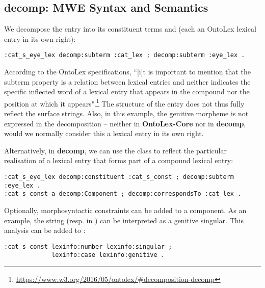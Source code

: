 \documentclass[output=paper,colorlinks,citecolor=brown]{langscibook}
\begin{document}
\subsection{decomp: MWE Syntax and Semantics}
\label{sec:decomp_mwe}


We decompose the entry into its constituent terms  and  (each an OntoLex lexical entry in its own right):

{\listingsize
\begin{verbatim}
:cat_s_eye_lex decomp:subterm :cat_lex ; decomp:subterm :eye_lex .
\end{verbatim}
}

\noindent According to the OntoLex specifications, ``[i]t is important to mention that the subterm property is a relation between lexical entries and neither indicates the specific inflected word of a lexical entry that appears in the compound nor the position at which it appears".\footnote{\url{https://www.w3.org/2016/05/ontolex/\#decomposition-decomp}}
The structure of the entry does not thus fully reflect the surface strings. Also, in this example, the genitive morpheme  is not expressed in the decomposition -- neither in \textbf{OntoLex-Core} nor in \textbf{decomp}, would we normally consider this a lexical entry in its own right.

Alternatively, in \textbf{decomp}, we can use the  class to reflect the particular realisation of a lexical entry that forms part of a compound lexical entry:

{\listingsize
\begin{verbatim}
:cat_s_eye_lex decomp:constituent :cat_s_const ; decomp:subterm :eye_lex .
:cat_s_const a decomp:Component ; decomp:correspondsTo :cat_lex .
\end{verbatim}
}

\noindent Optionally, morphosyntactic constraints can be added to a component. As an example, the string  (resp.  in ) can be interpreted as a genitive singular. This analysis can be added to :

{\listingsize
\begin{verbatim}
:cat_s_const lexinfo:number lexinfo:singular ;
             lexinfo:case lexinfo:genitive .
\end{verbatim}
}
\end{document}
